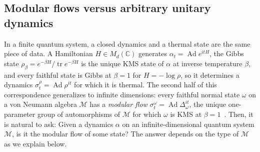 \documentclass[a4paper,11pt]{article}
\theoremstyle{definition}
\newcommand{\tr}{\text{tr}}
\begin{document}
\subsection{Modular flows versus arbitrary unitary dynamics}\label{sec:modular-vs-dynamics}



In a finite quantum system, a closed dynamics and a thermal state are the same piece of data. A Hamiltonian $H\in M_d(\mathbb C)$ generates $\alpha_t=\operatorname{Ad}e^{itH}$, the Gibbs state $\rho_\beta=e^{-\beta H}/\operatorname{tr}e^{-\beta H}$ is the unique KMS state of $\alpha$ at inverse temperature $\beta$, and every faithful state is Gibbs at $\beta=1$ for $H=-\log\rho$, so it determines a dynamics $\sigma^\rho_t=\operatorname{Ad}\rho^{it}$ for which it is thermal. The second half of this correspondence  generalizes to infinite dimensions: every faithful normal state $\omega$ on a von Neumann algebra $\mathcal M$ has a \emph{modular flow} $\sigma^\omega_t=\operatorname{Ad}\Delta_\omega^{it}$, the unique one-parameter group of automorphisms of $\mathcal M$ for which $\omega$ is KMS at $\beta=1$~\cite{Takesaki1970}.
Then, it is natural to ask: Given a dynamics $\alpha$ on an infinite-dimensional quantum system $\mathcal M$, is it the modular flow of some state? The answer depends on the type of $\mathcal M$ as we explain below.
\end{document}
